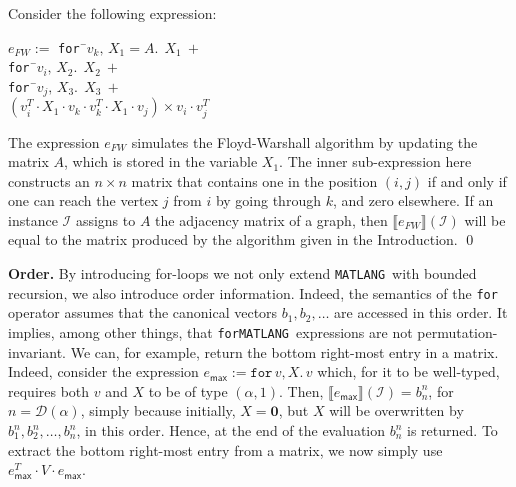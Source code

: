 \documentclass[sigconf]{acmart}
\newcommand{\sem}[2]{\llbracket #1 \rrbracket(#2)}
\newcommand{\I}{\mathcal{I}}
\newcommand{\dom}{\mathcal{D}}
\newcommand{\lang}{\texttt{MATLANG}\xspace}
\newcommand{\langfor}{\texttt{for}\text{-}\texttt{MATLANG}\xspace}
\newcommand{\ffor}[3]{\texttt{for}\, #1,#2 \texttt{.}\, #3}
\begin{document}
\begin{example}\label{ex:floyd}
Consider the following expression:
\begin{tabbing}
$e_{FW} := $ \texttt{for\,}\=$v_k,\, X_1\!=\!A.\ \ X_1 \ + $\\
\> \texttt{for\,}\=$v_i, \, X_2.\ \ X_2 \ +$ \\
\>\>\texttt{for\,}\=$v_j,\, X_3.\ \ X_3 \ +$ \\
\>\>\>$(v_i^T\cdot X_1\cdot v_k \cdot v_k^T\cdot X_1\cdot v_j)\times v_i\cdot v_j^T$
\end{tabbing}
The expression $e_{FW}$ simulates the Floyd-Warshall algorithm by updating the matrix $A$, which is stored in the variable $X_1$. The inner sub-expression here constructs an $n\times n$ matrix that contains one in the position $(i,j)$ if and only if one can reach the vertex $j$ from $i$ by going through $k$, and zero elsewhere. If an instance $\I$ assigns to $A$ the adjacency matrix of a graph, then $\sem{e_{FW}}{\I}$ will be equal to the matrix produced by the algorithm given in the Introduction.
\qed
\end{example}


\noindent\textbf{Order.} By introducing for-loops we not only extend \lang\ with bounded recursion, we also introduce order information. Indeed, the semantics of the \texttt{for} operator assumes that the canonical vectors $b_1,b_2,\ldots$
are accessed in this order. It implies, among other things, that \langfor\ expressions are not permutation-invariant.
We can, for example, return the bottom right-most entry in a matrix. Indeed, consider the expression $e_{\mathsf{max}} := \ffor{v}{X}{v}$ which, for it to be well-typed, requires both $v$ and $X$ to be of type $(\alpha,1)$. Then, $\sem{e_{\mathsf{max}}}{\I}=b_n^n$, for $n=\dom(\alpha)$, simply because initially, $X=\mathbf{0}$, but $X$ will be overwritten by $b_1^n,b_2^n,\ldots,b_n^n$, in this order. Hence, at the end of the evaluation $b_n^n$ is returned.
To extract the bottom right-most entry from a matrix, we now simply use $e_{\mathsf{max}}^T\cdot V\cdot e_{\mathsf{max}}$.
\end{document}
